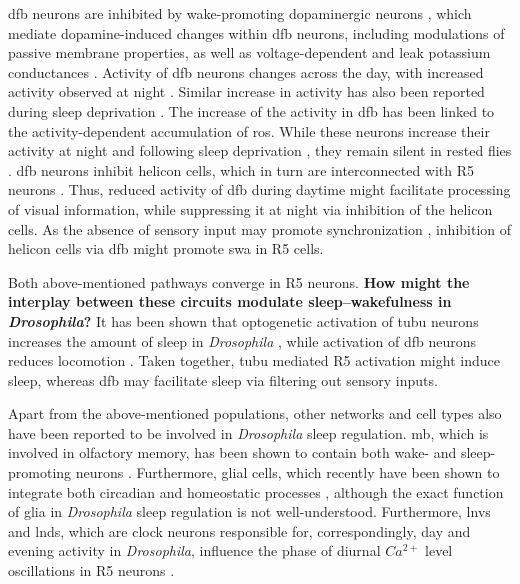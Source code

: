 \documentclass[../main.tex]{subfiles}
\begin{document}
\gls{dfb} neurons are inhibited by wake-promoting dopaminergic neurons \parencite{liuTwoDopaminergicNeurons2012}, which mediate dopamine-induced changes within \gls{dfb} neurons, including modulations of passive membrane properties, as well as voltage-dependent and leak potassium conductances \parencite{pimentelOperationHomeostaticSleep2016}. Activity of \gls{dfb} neurons changes across the day, with increased activity observed at night \parencite{raccugliaCoherentMultilevelNetwork2022}. Similar increase in activity has also been reported during sleep deprivation \parencite{pimentelOperationHomeostaticSleep2016}. The increase of the activity in \gls{dfb} has been linked to the activity-dependent accumulation of \gls{ros}.
While these neurons increase their activity at night and following sleep deprivation \parencite{raccugliaCoherentMultilevelNetwork2022}, they remain silent in rested flies \parencite{pimentelOperationHomeostaticSleep2016}.
\gls{dfb} neurons inhibit helicon cells, which in turn are interconnected with R5 neurons \parencite{suarez-grimaltNeuralArchitectureSleep2021,raccugliaCoherentMultilevelNetwork2022,shaferRegulationDrosophilaSleep2021}.
Thus, reduced activity of \gls{dfb} during daytime might facilitate processing of visual information, while suppressing it at night via inhibition of the helicon cells. As the absence of sensory input may promote synchronization \parencite{raccugliaCoherentMultilevelNetwork2022}, inhibition of helicon cells via \gls{dfb} might promote \gls{swa} in R5 cells.

Both above-mentioned pathways converge in R5 neurons. \textbf{How might the interplay between these circuits modulate sleep–wakefulness in \textit{Drosophila}?}
It has been shown that optogenetic activation of \gls{tubu} neurons increases the amount of sleep in \textit{Drosophila} \parencite{lamazeWakePromotingCircadianOutput2018}, while activation of \gls{dfb} neurons reduces locomotion \parencite{raccugliaCoherentMultilevelNetwork2022}. Taken together, \gls{tubu} mediated R5 activation might induce sleep, whereas \gls{dfb} may facilitate sleep via filtering out sensory inputs.

Apart from the above-mentioned populations, other networks and cell types also have been reported to be involved in \textit{Drosophila} sleep regulation. \gls{mb}, which is involved in olfactory memory, has been shown to contain both wake- and sleep-promoting neurons
\parencite{suarez-grimaltNeuralArchitectureSleep2021,dubowyCircadianRhythmsSleep2017}. Furthermore, glial cells, which recently have been shown to integrate both circadian and homeostatic processes \parencite{doppSinglecellTranscriptomicsReveals2024}, although the exact function of glia in \textit{Drosophila} sleep regulation is not well-understood. Furthermore,  \glspl{lnv} and \glspl{lnd}, which are clock neurons responsible for, correspondingly, day and evening activity in \textit{Drosophila}, influence the phase of diurnal $Ca^{2+}$ level oscillations in R5 neurons \parencite{andreaniCircadianProgrammingEllipsoid2022,liangMorningEveningCircadian2019}.
\end{document}
